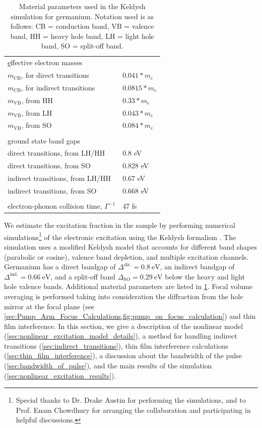 \begin{table}[]
	\centering
	\begin{tabular}{ll}
		{\ul effective electron masses} &  \\
		$m_{\textrm{CB}}$, for direct transitions & $0.041 * m_e$ \\
		$m_{\textrm{CB}}$, for indirect transitions & $0.0815 * m_e$ \\
		$m_{\textrm{VB}}$, from HH & $0.33 * m_e$ \\
		$m_{\textrm{VB}}$, from LH & $0.043 * m_e$ \\
		$m_{\textrm{VB}}$, from SO & $0.084 * m_e$ \\
		&  \\
		{\ul ground state band gaps} &  \\
		direct transitions, from LH/HH & 0.8 eV \\
		direct transitions,  from SO & 0.828 eV \\
		indirect transitions,  from LH/HH & 0.67 eV \\
		indirect transitions, from SO & 0.668 eV \\
		&  \\
		electron-phonon collision time, $\Gamma^{-1}$ & 47 fs
	\end{tabular}
	\caption{Material parameters used in the Keldysh simulation for germanium. Notation used is as follows: CB = conduction band, VB = valence band, HH = heavy hole band, LH = light hole band, SO = split-off band.}
	\label{tab:Keldysh_parameters}
\end{table}

We estimate the excitation fraction in the sample by performing numerical simulations\footnote{Special thanks to Dr. Drake Austin for performing the simulations, and to Prof. Enam Chowdhury for arranging the collaboration and participating in helpful discussions.} of the electronic excitation using the Keldysh formalism \cite{sergaevaUltrafastExcitationConductionband2018,keldyshIonizationFieldStrong1965,vpopruzhenkoKeldyshTheoryStrong2014}. The simulation uses a modified Keldysh model that accounts for different band shapes (parabolic or cosine), valence band depletion, and multiple excitation channels. Germanium has a direct bandgap of $\Delta^{\textrm{dir.}} = 0.8 \ \textrm{eV}$, an indirect bandgap of $\Delta^{\textrm{ind.}} = 0.66 \ \textrm{eV}$, and a split-off band $\Delta_{\textrm{SO}} = 0.29 \ \textrm{eV}$ below the heavy and light hole valence bands. Additional material parameters are listed in \cref{tab:Keldysh_parameters}. Focal volume averaging is performed taking into consideration the diffraction from the hole mirror at the focal plane (see \cref{sec:Pump_Arm_Focus_Calculations,fig:pump_on_focus_calculation}) and thin film interference. In this section, we give a description of the nonlinear model (\cref{sec:nonlinear_excitation_model_details}), a method for handling indirect transitions (\cref{sec:indirect_transitions}), thin film interference calculations (\cref{sec:thin_film_interference}), a discussion about the bandwidth of the pulse (\cref{sec:bandwidth_of_pulse}), and the main results of the simulation (\cref{sec:nonlinear_excitation_results}).


